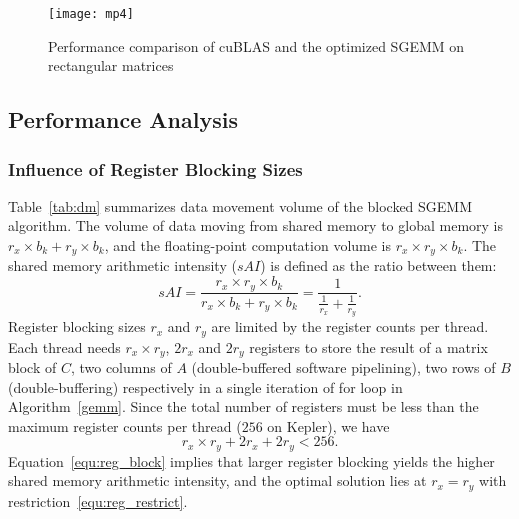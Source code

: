 \begin{figure*}[htbp]
\begin{center}
\texttt{[image: mp4]}
\caption{Performance comparison of cuBLAS and the optimized SGEMM on rectangular matrices}
\label{fig:rect}
\end{center}
\end{figure*}

\subsection{Performance Analysis}

\subsubsection{Influence of Register Blocking Sizes}
Table~\ref{tab:dm} summarizes data movement volume of the blocked SGEMM algorithm.
The volume of data moving from shared memory to global memory is $r_x\times b_k+ r_y\times b_k$, and the floating-point computation volume is $r_x\times r_y\times b_k$. 
The shared memory arithmetic intensity ($sAI$) is defined as the ratio between them:
\begin{equation}
sAI = \frac {r_x\times 
r_y\times b_k} {r_x\times b_k+ r_y\times b_k} = \frac{1}{\frac{1}{r_x} + \frac{1}{r_y}}.
    \label{equ:reg_block}
\end{equation}
Register blocking sizes $r_x$ and $r_y$ are limited by the register counts per thread. 
Each thread needs $r_x\times r_y$, $2r_x$ and $2r_y$ registers to store the result of a matrix block of $C$,  two columns of $A$ (double-buffered software pipelining),  two rows of $B$ (double-buffering) respectively in a single iteration of for loop in Algorithm~\ref{gemm}.
Since the total number of registers must be less than the maximum register counts per thread ($256$ on Kepler), we have
\begin{equation}
    r_x\times r_y + 2r_x + 2r_y < 256.
\label{equ:reg_restrict}
\end{equation}
Equation~\ref{equ:reg_block} implies that larger register blocking yields the higher shared memory arithmetic intensity,
and the optimal solution lies at $r_x=r_y$ with restriction~\ref{equ:reg_restrict}. 
